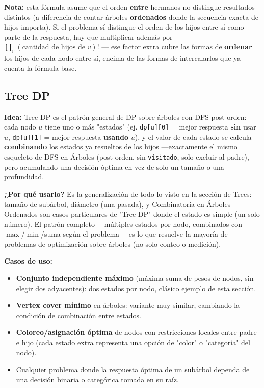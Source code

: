 \documentclass[10pt,a4paper,twocolumn]{article}
\begin{document}
\textbf{Nota:} esta fórmula asume que el orden \textbf{entre}
hermanos no distingue resultados distintos (a diferencia de contar
árboles \textbf{ordenados} donde la secuencia exacta de hijos
importa). Si el problema sí distingue el orden de los hijos entre sí
como parte de la respuesta, hay que multiplicar además por
$\prod_v (\text{cantidad de hijos de } v)!$ — ese factor extra cubre
las formas de \textbf{ordenar} los hijos de cada nodo entre sí,
encima de las formas de intercalarlos que ya cuenta la fórmula base.


\subsection{Tree DP}

\textbf{Idea:} Tree DP es el patrón general de DP sobre árboles con
DFS post-orden: cada nodo $u$ tiene uno o más "estados" (ej.
\texttt{dp[u][0]} = mejor respuesta \textbf{sin} usar $u$,
\texttt{dp[u][1]} = mejor respuesta \textbf{usando} $u$), y el valor
de cada estado se calcula \textbf{combinando} los estados ya
resueltos de los hijos —exactamente el mismo esqueleto de DFS en
Árboles (post-orden, sin \texttt{visitado}, solo excluir al padre),
pero acumulando una decisión óptima en vez de solo un tamaño o una
profundidad.

\textbf{¿Por qué usarlo?} Es la generalización de todo lo visto en
la sección de Trees: tamaño de subárbol, diámetro (una pasada), y
Combinatoria en Árboles Ordenados son casos particulares de "Tree
DP" donde el estado es simple (un solo número). El patrón completo
—múltiples estados por nodo, combinados con $\max$/$\min$/suma según
el problema— es lo que resuelve la mayoría de problemas de
optimización sobre árboles (no solo conteo o medición).

\textbf{Casos de uso:}

\begin{itemize}
	\item \textbf{Conjunto independiente máximo} (máxima suma de
	pesos de nodos, sin elegir dos adyacentes): dos estados por nodo,
	clásico ejemplo de esta sección.
	\item \textbf{Vertex cover mínimo} en árboles: variante muy
	similar, cambiando la condición de combinación entre estados.
	\item \textbf{Coloreo/asignación óptima} de nodos con
	restricciones locales entre padre e hijo (cada estado extra
	representa una opción de "color" o "categoría" del nodo).
	\item Cualquier problema donde la respuesta óptima de un subárbol
	dependa de una decisión binaria o categórica tomada en su raíz.
\end{itemize}
\end{document}
